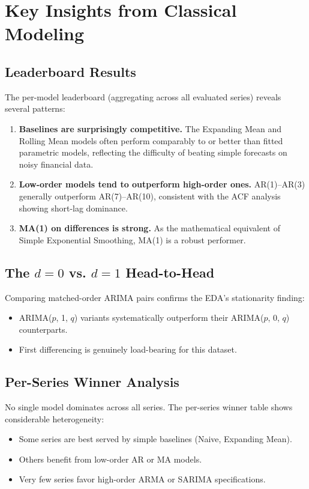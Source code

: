 \section{Key Insights from Classical Modeling}

\subsection{Leaderboard Results}

The per-model leaderboard (aggregating across all evaluated series) reveals several patterns:

\begin{enumerate}
    \item \textbf{Baselines are surprisingly competitive.} The Expanding Mean and Rolling Mean models often perform comparably to or better than fitted parametric models, reflecting the difficulty of beating simple forecasts on noisy financial data.
    \item \textbf{Low-order models tend to outperform high-order ones.} AR(1)--AR(3) generally outperform AR(7)--AR(10), consistent with the ACF analysis showing short-lag dominance.
    \item \textbf{MA(1) on differences is strong.} As the mathematical equivalent of Simple Exponential Smoothing, MA(1) is a robust performer.
\end{enumerate}

\subsection{The $d=0$ vs. $d=1$ Head-to-Head}

Comparing matched-order ARIMA pairs confirms the EDA's stationarity finding:
\begin{itemize}
    \item ARIMA($p$, 1, $q$) variants systematically outperform their ARIMA($p$, 0, $q$) counterparts.
    \item First differencing is genuinely load-bearing for this dataset.
\end{itemize}

\subsection{Per-Series Winner Analysis}

No single model dominates across all series. The per-series winner table shows considerable heterogeneity:
\begin{itemize}
    \item Some series are best served by simple baselines (Naive, Expanding Mean).
    \item Others benefit from low-order AR or MA models.
    \item Very few series favor high-order ARMA or SARIMA specifications.
\end{itemize}

